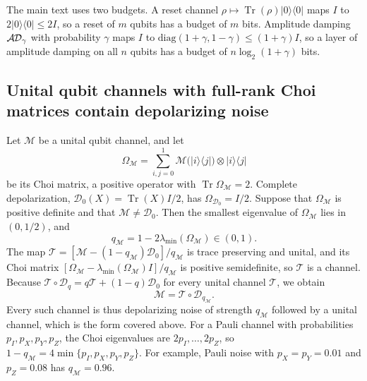 \documentclass[aps,pra,reprint,superscriptaddress,floatfix]{revtex4-2}
\theoremstyle{plain}
\newcommand{\tr}{\operatorname{Tr}}
\newcommand{\ketbra}[2]{|#1\rangle\!\langle #2|}
\newcommand{\cD}{\mathcal D}
\newcommand{\AD}{\mathcal{A\hspace{-0.6pt}D}}
\begin{document}
The main text uses two budgets. A reset channel $\rho\mapsto\tr(\rho)\ketbra00$ maps $I$ to $2\ketbra00\le2I$, so a reset of $m$ qubits has a budget of $m$ bits. Amplitude damping $\AD_\gamma$ with probability $\gamma$ maps $I$ to $\mathrm{diag}(1+\gamma,1-\gamma)\le(1+\gamma)I$, so a layer of amplitude damping on all $n$ qubits has a budget of $n\log_2(1+\gamma)$ bits.

\subsection{Unital qubit channels with full-rank Choi matrices contain depolarizing noise}

Let $\mathcal M$ be a unital qubit channel, and let
\begin{equation}
\Omega_{\mathcal M}=\sum_{i,j=0}^1\mathcal M\bigl(\ketbra ij\bigr)\otimes\ketbra ij
\end{equation}
be its Choi matrix, a positive operator with $\tr\Omega_{\mathcal M}=2$. Complete depolarization, $\cD_0(X)=\tr(X)I/2$, has $\Omega_{\cD_0}=I/2$. Suppose that $\Omega_{\mathcal M}$ is positive definite and that $\mathcal M\ne\cD_0$. Then the smallest eigenvalue of $\Omega_{\mathcal M}$ lies in $(0,1/2)$, and
\begin{equation}
q_{\mathcal M}=1-2\lambda_{\min}(\Omega_{\mathcal M})\in(0,1).
\end{equation}
The map $\mathcal T=[\mathcal M-(1-q_{\mathcal M})\cD_0]/q_{\mathcal M}$ is trace preserving and unital, and its Choi matrix $[\Omega_{\mathcal M}-\lambda_{\min}(\Omega_{\mathcal M})I]/q_{\mathcal M}$ is positive semidefinite, so $\mathcal T$ is a channel. Because $\mathcal T\circ\cD_q=q\mathcal T+(1-q)\cD_0$ for every unital channel $\mathcal T$, we obtain
\begin{equation}
\mathcal M=\mathcal T\circ\cD_{q_{\mathcal M}} .
\end{equation}
Every such channel is thus depolarizing noise of strength $q_{\mathcal M}$ followed by a unital channel, which is the form covered above. For a Pauli channel with probabilities $p_I,p_X,p_Y,p_Z$, the Choi eigenvalues are $2p_I,\dots,2p_Z$, so $1-q_{\mathcal M}=4\min\{p_I,p_X,p_Y,p_Z\}$. For example, Pauli noise with $p_X=p_Y=0.01$ and $p_Z=0.08$ has $q_{\mathcal M}=0.96$.
\end{document}
